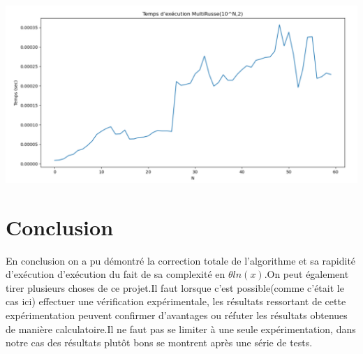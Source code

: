\documentclass[12pt,a4paper]{report}
\begin{document}
\begin{flushleft}
\begin{center}
\hfill
\begin{minipage}{0.49\linewidth}
\includegraphics[width=\linewidth]{courbePasCleanDuTout}
\end{minipage}
\end{center}
\end{flushleft}

\section*{Conclusion}
\begin{flushleft}

\end{flushleft}
En conclusion on a pu démontré la correction totale de l'algorithme et sa rapidité d'exécution d'exécution du fait de sa complexité en $ \theta ln(x)$.On peut également tirer plusieurs choses de ce projet.Il faut lorsque c'est possible(comme c'était le cas ici) effectuer une vérification expérimentale, les résultats ressortant de cette expérimentation peuvent confirmer d'avantages ou réfuter les résultats obtenues de manière calculatoire.Il ne faut pas se limiter à une seule expérimentation, dans notre cas des résultats plutôt bons se montrent après une série de tests. 
\end{document}
